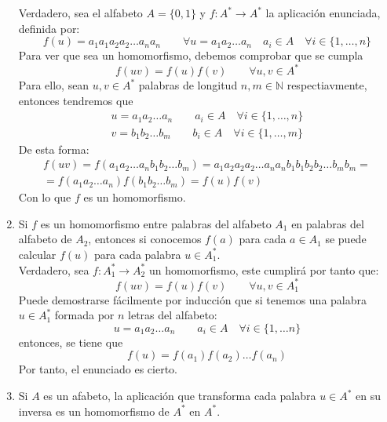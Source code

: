 \begin{enumerate}
        Verdadero, sea el alfabeto $A=\{0,1\}$ y $f:A^\ast\rightarrow A^\ast$ la aplicación enunciada, definida por:
        \begin{equation*}
            f(u) = a_1a_1a_2a_2\ldots a_na_n \qquad \forall u = a_1a_2\ldots a_n \quad a_i \in A \quad \forall i \in \{1,\ldots, n\}
        \end{equation*}
        Para ver que sea un homomorfismo, debemos comprobar que se cumpla
        \begin{equation*}
            f(uv) = f(u)f(v) \qquad \forall u,v\in A^\ast
        \end{equation*}
        Para ello, sean $u,v\in A^\ast$ palabras de longitud $n,m\in \mathbb{N}$ respectiavmente, entonces tendremos que
        \begin{gather*}
            u = a_1a_2 \ldots a_n \qquad a_i \in A \quad \forall i \in \{1,\ldots, n\} \\
            v = b_1b_2 \ldots b_m \qquad b_i \in A \quad \forall i \in \{1,\ldots, m\} 
        \end{gather*}
        De esta forma:
        \begin{multline*}
            f(uv) = f(a_1a_2 \ldots a_nb_1b_2\ldots b_m) = a_1a_2a_2a_2\ldots a_na_nb_1b_1b_2b_2\ldots b_mb_m = \\ = f(a_1a_2\ldots a_n)f(b_1b_2\ldots b_m) = f(u)f(v)
        \end{multline*}
        Con lo que $f$ es un homomorfismo.
    \item Si $f$ es un homomorfismo entre palabras del alfabeto $A_1$ en palabras del alfabeto de $A_2$, entonces si conocemos $f(a)$ para cada $a\in A_1$ se puede calcular $f(u)$ para cada palabra $u\in A_1^\ast$.\\

        Verdadero, sea $f:A_1^\ast\rightarrow A_2^\ast$ un homomorfismo, este cumplirá por tanto que:
        \begin{equation*}
            f(uv) = f(u)f(v) \qquad \forall u,v\in A_1^\ast
        \end{equation*}
        Puede demostrarse fácilmente por inducción que si tenemos una palabra ${u\in A_1^\ast}$ formada por $n$ letras del alfabeto:
        \begin{equation*}
            u = a_1a_2\ldots a_n \qquad a_i \in A \quad \forall i \in \{1,\ldots n\}
        \end{equation*}
        entonces, se tiene que
        \begin{equation*}
            f(u) = f(a_1)f(a_2)\ldots f(a_n)
        \end{equation*}
        Por tanto, el enunciado es cierto.
    \item Si $A$ es un afabeto, la aplicación que transforma cada palabra $u\in A^\ast$ en su inversa es un homomorfismo de $A^\ast$ en $A^\ast$.\\


\end{enumerate}
